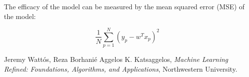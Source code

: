\documentclass[11pt]{article}
\begin{document}
The efficacy of the model can be measured by the mean squared error (MSE) of the model:

\begin{equation}
    \frac{1}{N} \sum_{p=1}^{N} (y_p - w^T x_p)^2
\end{equation}

%


\begin{thebibliography}{77}

Jeremy Watt\'{o}s, Reza Borhani\'{e} Aggelos K. Katsaggelos,
\emph{Machine Learning Refined: Foundations, Algorithms, and Applications},
Northwestern University.

\end{thebibliography}
\end{document}
